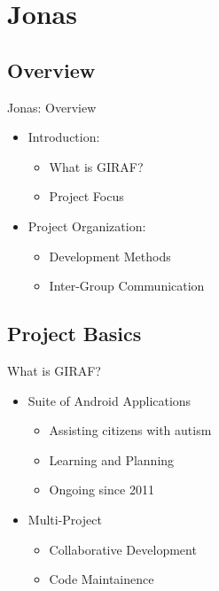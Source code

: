 \section{Jonas}
\subsection{Overview}
\begin{frame}{Jonas: Overview}
\begin{itemize}
	\item Introduction:
  		\begin{itemize}
			\item What is GIRAF?
			\item Project Focus
		\end{itemize}
	\item Project Organization:
		\begin{itemize}
			\item Development Methods
			\item Inter-Group Communication
		\end{itemize}
\end{itemize}
\end{frame}
 
\subsection{Project Basics}
\begin{frame}{What is GIRAF?}
\begin{itemize}
	\item Suite of Android Applications
		\begin{itemize}
		    \item Assisting citizens with autism 
  			\item Learning and Planning
  			\item Ongoing since 2011
		\end{itemize}
	\item Multi-Project
		\begin{itemize}
		    \item Collaborative Development 
  			\item Code Maintainence
		\end{itemize}
\end{itemize}
\end{frame}

